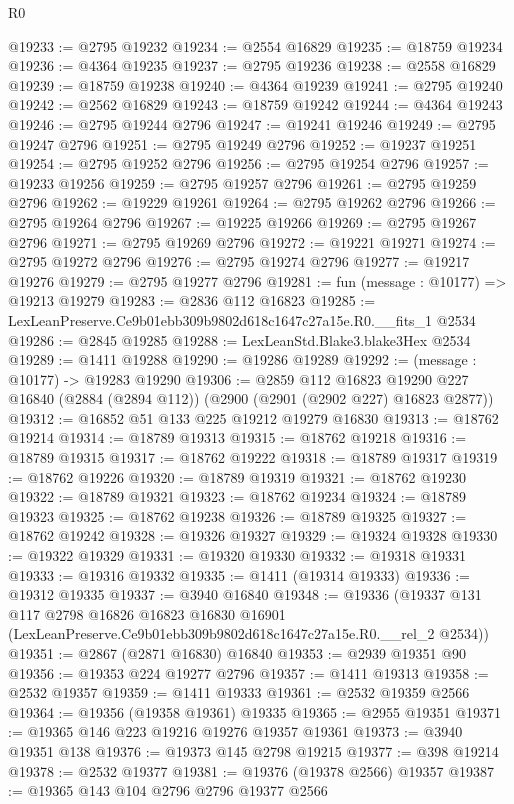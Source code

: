 \begin{lexlean}{R0}
\begin{coremodule}
@19233 := @2795 @19232
@19234 := @2554 @16829
@19235 := @18759 @19234
@19236 := @4364 @19235
@19237 := @2795 @19236
@19238 := @2558 @16829
@19239 := @18759 @19238
@19240 := @4364 @19239
@19241 := @2795 @19240
@19242 := @2562 @16829
@19243 := @18759 @19242
@19244 := @4364 @19243
@19246 := @2795 @19244 @2796
@19247 := @19241 @19246
@19249 := @2795 @19247 @2796
@19251 := @2795 @19249 @2796
@19252 := @19237 @19251
@19254 := @2795 @19252 @2796
@19256 := @2795 @19254 @2796
@19257 := @19233 @19256
@19259 := @2795 @19257 @2796
@19261 := @2795 @19259 @2796
@19262 := @19229 @19261
@19264 := @2795 @19262 @2796
@19266 := @2795 @19264 @2796
@19267 := @19225 @19266
@19269 := @2795 @19267 @2796
@19271 := @2795 @19269 @2796
@19272 := @19221 @19271
@19274 := @2795 @19272 @2796
@19276 := @2795 @19274 @2796
@19277 := @19217 @19276
@19279 := @2795 @19277 @2796
@19281 := fun (message : @10177) => @19213 @19279
@19283 := @2836 @112 @16823
@19285 := LexLeanPreserve.Ce9b01ebb309b9802d618c1647c27a15e.R0.__fits_1 @2534
@19286 := @2845 @19285
@19288 := LexLeanStd.Blake3.blake3Hex @2534
@19289 := @1411 @19288
@19290 := @19286 @19289
@19292 := (message : @10177) -> @19283 @19290
@19306 := @2859
    @112
    @16823
    @19290
    @227
    @16840
    (@2884 (@2894 @112))
    (@2900 (@2901 (@2902 @227) @16823 @2877))
@19312 := @16852 @51 @133 @225 @19212 @19279 @16830
@19313 := @18762 @19214
@19314 := @18789 @19313
@19315 := @18762 @19218
@19316 := @18789 @19315
@19317 := @18762 @19222
@19318 := @18789 @19317
@19319 := @18762 @19226
@19320 := @18789 @19319
@19321 := @18762 @19230
@19322 := @18789 @19321
@19323 := @18762 @19234
@19324 := @18789 @19323
@19325 := @18762 @19238
@19326 := @18789 @19325
@19327 := @18762 @19242
@19328 := @19326 @19327
@19329 := @19324 @19328
@19330 := @19322 @19329
@19331 := @19320 @19330
@19332 := @19318 @19331
@19333 := @19316 @19332
@19335 := @1411 (@19314 @19333)
@19336 := @19312 @19335
@19337 := @3940 @16840
@19348 := @19336
    (@19337
      @131
      @117
      @2798
      @16826
      @16823
      @16830
      @16901
      (LexLeanPreserve.Ce9b01ebb309b9802d618c1647c27a15e.R0.__rel_2 @2534))
@19351 := @2867 (@2871 @16830) @16840
@19353 := @2939 @19351 @90
@19356 := @19353 @224 @19277 @2796
@19357 := @1411 @19313
@19358 := @2532 @19357
@19359 := @1411 @19333
@19361 := @2532 @19359 @2566
@19364 := @19356 (@19358 @19361) @19335
@19365 := @2955 @19351
@19371 := @19365 @146 @223 @19216 @19276 @19357 @19361
@19373 := @3940 @19351 @138
@19376 := @19373 @145 @2798 @19215
@19377 := @398 @19214
@19378 := @2532 @19377
@19381 := @19376 (@19378 @2566) @19357
@19387 := @19365 @143 @104 @2796 @2796 @19377 @2566

\end{coremodule}
\end{lexlean}
